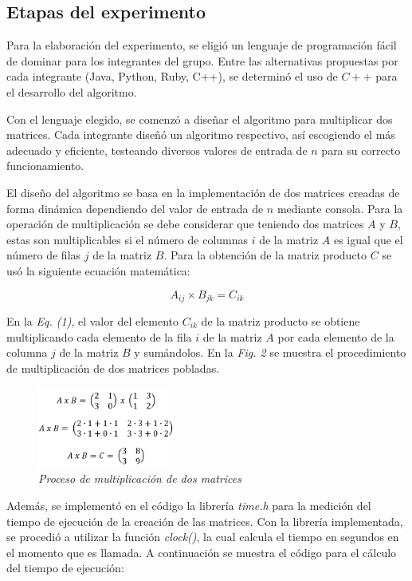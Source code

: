 \documentclass[11pt, twocolumn]{llncs}
\begin{document}
\subsection{Etapas del experimento}
Para la elaboración del experimento, se eligió un lenguaje de programación fácil de dominar para los integrantes del grupo. Entre las alternativas propuestas por cada integrante (Java, Python, Ruby, C++), se determinó el uso de $C++$ para el desarrollo del algoritmo.

Con el lenguaje elegido, se comenzó a diseñar el algoritmo para multiplicar dos matrices. Cada integrante diseñó un algoritmo respectivo, así escogiendo el más adecuado y eficiente, testeando diversos valores de entrada de $n$ para su correcto funcionamiento.

El diseño del algoritmo se basa en la implementación de dos matrices creadas de forma dinámica dependiendo del valor de entrada de $n$ mediante consola. Para la operación de multiplicación se debe considerar que teniendo dos matrices $A$ y $B$, estas son multiplicables si el número de columnas $i$ de la matriz $A$ es igual que el número de filas $j$ de la matriz $B$. Para la obtención de la matriz producto $C$ se usó la siguiente ecuación matemática:

\begin{equation}
A_{ij} \times B_{jk} = C_{ik}
\end{equation}

En la \textit{Eq. (1)}, el valor del elemento $C_{ik}$ de la matriz producto se obtiene multiplicando cada elemento de la fila $i$ de la matriz $A$ por cada elemento de la columna $j$ de la matriz $B$ y sumándolos. En la \textit{Fig. 2} se muestra el procedimiento de multiplicación de dos matrices pobladas.

\begin{figure}[H]
\caption{\textit{\label{fig:multiplicacion}Proceso de multiplicación de dos matrices}}
\centering
\includegraphics[width=0.4\textwidth]{imagenes/multiplicacion.png}
\end{figure}

Además, se implementó en el código la librería \textit{time.h} para la medición del tiempo de ejecución de la creación de las matrices. Con la librería implementada, se procedió a utilizar la función \textit{clock()}, la cual calcula el tiempo en segundos en el momento que es llamada. A continuación se muestra el código para el cálculo del tiempo de ejecución:
\end{document}
